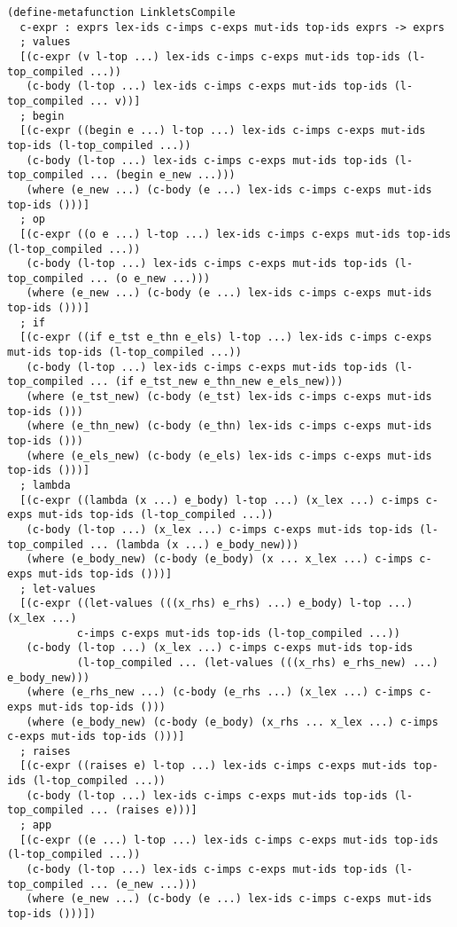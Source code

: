 \begin{lstlisting}[language=pltredex,
                basicstyle=\ttfamily\scriptsize,
                numbers=none, xleftmargin=2em]
(define-metafunction LinkletsCompile
  c-expr : exprs lex-ids c-imps c-exps mut-ids top-ids exprs -> exprs
  ; values
  [(c-expr (v l-top ...) lex-ids c-imps c-exps mut-ids top-ids (l-top_compiled ...))
   (c-body (l-top ...) lex-ids c-imps c-exps mut-ids top-ids (l-top_compiled ... v))]
  ; begin
  [(c-expr ((begin e ...) l-top ...) lex-ids c-imps c-exps mut-ids top-ids (l-top_compiled ...))
   (c-body (l-top ...) lex-ids c-imps c-exps mut-ids top-ids (l-top_compiled ... (begin e_new ...)))
   (where (e_new ...) (c-body (e ...) lex-ids c-imps c-exps mut-ids top-ids ()))]
  ; op
  [(c-expr ((o e ...) l-top ...) lex-ids c-imps c-exps mut-ids top-ids (l-top_compiled ...))
   (c-body (l-top ...) lex-ids c-imps c-exps mut-ids top-ids (l-top_compiled ... (o e_new ...)))
   (where (e_new ...) (c-body (e ...) lex-ids c-imps c-exps mut-ids top-ids ()))]
  ; if
  [(c-expr ((if e_tst e_thn e_els) l-top ...) lex-ids c-imps c-exps mut-ids top-ids (l-top_compiled ...))
   (c-body (l-top ...) lex-ids c-imps c-exps mut-ids top-ids (l-top_compiled ... (if e_tst_new e_thn_new e_els_new)))
   (where (e_tst_new) (c-body (e_tst) lex-ids c-imps c-exps mut-ids top-ids ()))
   (where (e_thn_new) (c-body (e_thn) lex-ids c-imps c-exps mut-ids top-ids ()))
   (where (e_els_new) (c-body (e_els) lex-ids c-imps c-exps mut-ids top-ids ()))]
  ; lambda
  [(c-expr ((lambda (x ...) e_body) l-top ...) (x_lex ...) c-imps c-exps mut-ids top-ids (l-top_compiled ...))
   (c-body (l-top ...) (x_lex ...) c-imps c-exps mut-ids top-ids (l-top_compiled ... (lambda (x ...) e_body_new)))
   (where (e_body_new) (c-body (e_body) (x ... x_lex ...) c-imps c-exps mut-ids top-ids ()))]
  ; let-values
  [(c-expr ((let-values (((x_rhs) e_rhs) ...) e_body) l-top ...) (x_lex ...)
           c-imps c-exps mut-ids top-ids (l-top_compiled ...))
   (c-body (l-top ...) (x_lex ...) c-imps c-exps mut-ids top-ids
           (l-top_compiled ... (let-values (((x_rhs) e_rhs_new) ...) e_body_new)))
   (where (e_rhs_new ...) (c-body (e_rhs ...) (x_lex ...) c-imps c-exps mut-ids top-ids ()))
   (where (e_body_new) (c-body (e_body) (x_rhs ... x_lex ...) c-imps c-exps mut-ids top-ids ()))]
  ; raises
  [(c-expr ((raises e) l-top ...) lex-ids c-imps c-exps mut-ids top-ids (l-top_compiled ...))
   (c-body (l-top ...) lex-ids c-imps c-exps mut-ids top-ids (l-top_compiled ... (raises e)))]
  ; app
  [(c-expr ((e ...) l-top ...) lex-ids c-imps c-exps mut-ids top-ids (l-top_compiled ...))
   (c-body (l-top ...) lex-ids c-imps c-exps mut-ids top-ids (l-top_compiled ... (e_new ...)))
   (where (e_new ...) (c-body (e ...) lex-ids c-imps c-exps mut-ids top-ids ()))])


\end{lstlisting}
